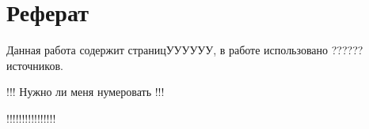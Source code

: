 \section*{Реферат}
    Данная работа содержит \pageref{LastPage} страницУУУУУУ, в работе использовано ?????? источников.


    !!!
    Нужно ли меня нумеровать
    !!!

    !!!!!!!!!!!!!!!!